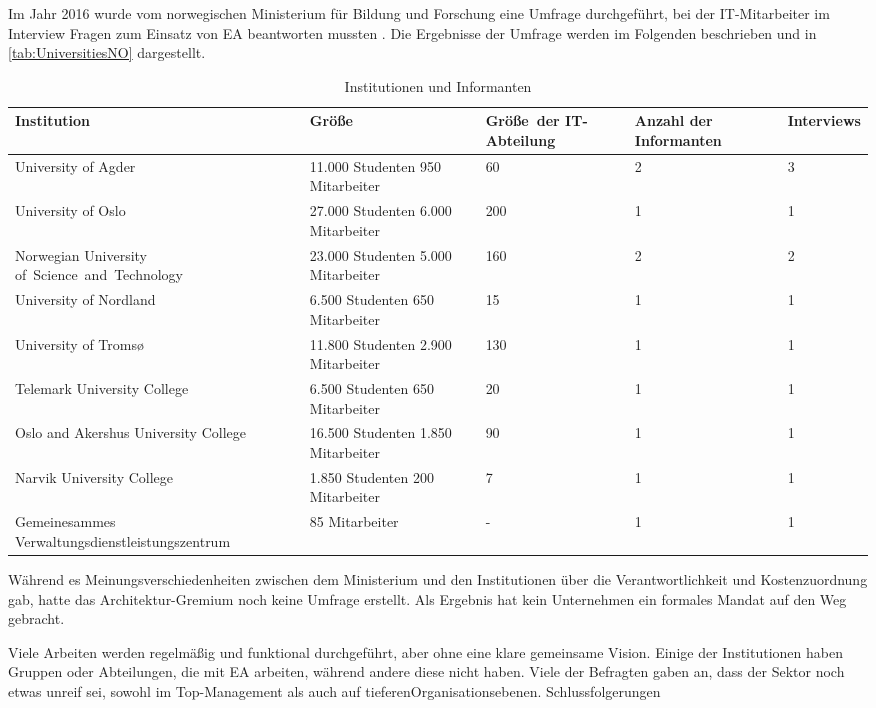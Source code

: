 \documentclass[
	doc,
	a4paper,
	helv
	]{apa6}
\begin{document}
Im Jahr 2016 wurde vom norwegischen Ministerium für Bildung und Forschung eine Umfrage durchgeführt, bei der IT-Mitarbeiter im Interview Fragen zum Einsatz von EA beantworten mussten \autocite{Olsen2016}. Die Ergebnisse der Umfrage werden im Folgenden beschrieben und in \autoref{tab:UniversitiesNO} dargestellt.
\begin{table}[htbp]
\caption{Institutionen und Informanten \autocite{Olsen2016}}
\begin{center}
\begin{tabularx}{\textwidth}{|p{5cm}|p{3cm}|X|X|X|}
\hline
Institution										& Größe									& \mbox{Größe der} \mbox{IT-Abteilung}	& Anzahl der Informanten	& Interviews \\\hline
University of Agder								& 11.000 Studenten 950 Mitarbeiter		& 60						& 2 						& 3 \\\hline
University of Oslo								& 27.000 Studenten 6.000 Mitarbeiter	& 200						& 1							& 1 \\\hline
Norwegian University \mbox{of Science and Technology}	& 23.000 Studenten 5.000 Mitarbeiter	& 160						& 2 						& 2 \\\hline
University of Nordland							& 6.500 Studenten 650 Mitarbeiter		& 15						& 1 						& 1 \\\hline
University of Troms\o							& 11.800 Studenten 2.900 Mitarbeiter	& 130 						& 1 						& 1 \\\hline
Telemark University College						& 6.500 Studenten 650 Mitarbeiter 		& 20 						& 1 						& 1 \\\hline
Oslo and Akershus University College			& 16.500 Studenten 1.850 Mitarbeiter	& 90 						& 1 						& 1 \\\hline
Narvik University College						& 1.850 Studenten 200 Mitarbeiter 		& 7							& 1 						& 1 \\\hline
Gemeinesammes Verwaltungsdienstleistungszentrum	& 85 Mitarbeiter 						& -		 					& 1 						& 1 \\\hline
\end{tabularx}
\end{center}
\label{tab:UniversitiesNO}
\end{table}%


Während es Meinungsverschiedenheiten zwischen dem Ministerium und den Institutionen über die Verantwortlichkeit und Kostenzuordnung gab, hatte das Architektur-Gremium noch keine Umfrage erstellt. Als Ergebnis hat kein Unternehmen ein formales Mandat auf den Weg gebracht.

Viele Arbeiten werden regelmäßig und funktional durchgeführt, aber ohne eine klare gemeinsame Vision. Einige der Institutionen haben Gruppen oder Abteilungen, die mit EA arbeiten, während andere diese nicht haben. Viele der Befragten gaben an, dass der Sektor noch etwas unreif sei, sowohl im Top-Management als auch auf tieferenOrganisationsebenen.
Schlussfolgerungen
\end{document}
